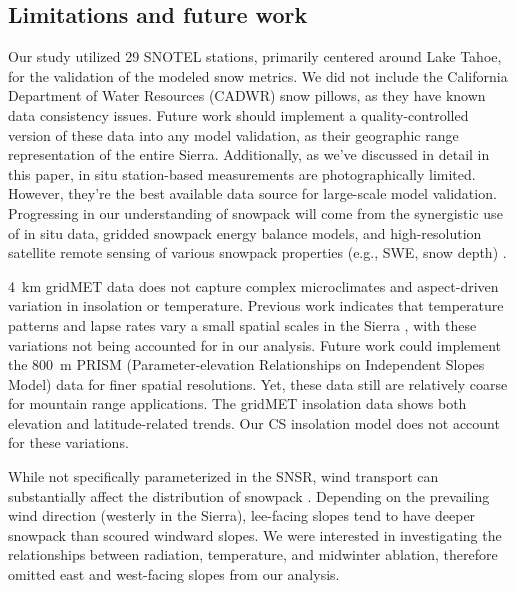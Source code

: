 \hypertarget{ch2-discussion-1}{\subsection{Limitations and future work}\label{ch2-discussion-1}}

Our study utilized 29 SNOTEL stations, primarily centered around Lake Tahoe, for the validation of the modeled snow metrics. We did not include the California Department of Water Resources (CADWR) snow pillows, as they have known data consistency issues. Future work should implement a quality-controlled version of these data into any model validation, as their geographic range representation of the entire Sierra. Additionally, as we've discussed in detail in this paper, in situ station-based measurements are photographically limited. However, they're the best available data source for large-scale model validation. Progressing in our understanding of snowpack will come from the synergistic use of in situ data, gridded snowpack energy balance models, and high-resolution satellite remote sensing of various snowpack properties (e.g., SWE, snow depth) \citep{flemingSNOTELSoilClimate2023}.

4~km gridMET data does not capture complex microclimates and aspect-driven variation in insolation or temperature. Previous work indicates that temperature patterns and lapse rates vary a small spatial scales in the Sierra \citep{lundquistSurfaceTemperaturePatterns2007}, with these variations not being accounted for in our analysis. Future work could implement the 800~m PRISM (Parameter-elevation Relationships on Independent Slopes Model) data \citep{dalyStatisticalTopographicModelMapping1994} for finer spatial resolutions. Yet, these data still are relatively coarse for mountain range applications. The gridMET insolation data shows both elevation and latitude-related trends. Our CS insolation model does not account for these variations.

While not specifically parameterized in the SNSR, wind transport can substantially affect the distribution of snowpack \citep{winstralSpatialSnowModeling2002,marksSimulationTerrainForest2002}. Depending on the prevailing wind direction (westerly in the Sierra), lee-facing slopes tend to have deeper snowpack than scoured windward slopes. We were interested in investigating the relationships between radiation, temperature, and midwinter ablation, therefore omitted east and west-facing slopes from our analysis.

